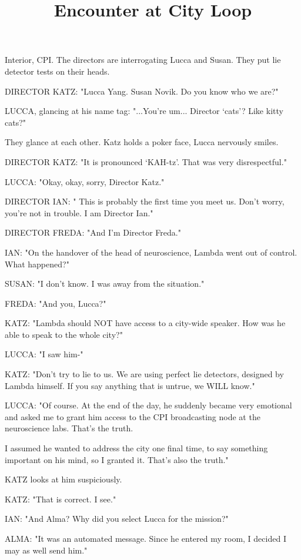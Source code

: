 \documentclass[11pt]{article}
\begin{document}
\ttfamily
\title{Encounter at City Loop}
\maketitle

Interior, CPI.
The directors are interrogating Lucca and Susan.
They put lie detector tests on their heads.

DIRECTOR KATZ: "Lucca Yang. 
Susan Novik.
Do you know who we are?"

LUCCA, glancing at his name tag: "...You're um... Director `cats'? Like kitty cats?"

They glance at each other. 
Katz holds a poker face, Lucca nervously smiles.

DIRECTOR KATZ: "It is pronounced `KAH-tz'.
That was very disrespectful."

LUCCA: "Okay, okay, sorry, Director Katz."

DIRECTOR IAN: "
This is probably the first time you meet us. 
Don't worry, you're not in trouble.
I am Director Ian." 

DIRECTOR FREDA: "And I'm Director Freda." 

IAN: "On the handover of the head of neuroscience, Lambda went out of control. 
What happened?"

SUSAN: "I don't know. I was away from the situation."

FREDA: "And you, Lucca?"

KATZ: "Lambda should NOT have access to a city-wide speaker. 
How was he able to speak to the whole city?"

LUCCA: "I saw him-"

KATZ: "Don't try to lie to us. We are using perfect lie detectors, designed by Lambda himself.
If you say anything that is untrue, we WILL know."

LUCCA: "Of course. 
At the end of the day, he suddenly became very emotional and asked me to grant him access to the CPI broadcasting node at the neuroscience labs.
That's the truth.

I assumed he wanted to address the city one final time, to say something important on his mind, so I granted it.
That's also the truth."

KATZ looks at him suspiciously.

KATZ: "That is correct. 
I see."

IAN: "And Alma? 
Why did you select Lucca for the mission?"

ALMA: "It was an automated message.
Since he entered my room, I decided I may as well send him."
\end{document}
